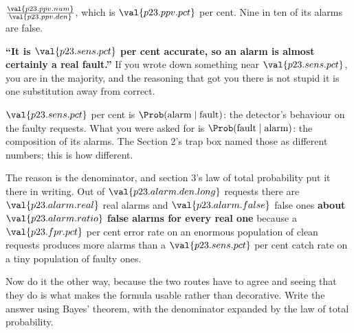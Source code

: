 \begin{fr}
\begin{ansblock}
$\frac{\val{p23.ppv.num}}{\val{p23.ppv.den}}$, which is
$\val{p23.ppv.pct}$ per cent. Nine in ten of its alarms are false.
\end{ansblock}

\begin{trapbox}
\textbf{\enquote{It is $\val{p23.sens.pct}$ per cent accurate, so an alarm is
almost certainly a real fault.}} If you wrote down something near
$\val{p23.sens.pct}$, you are in the majority, and the reasoning that got you
there is not stupid \dash{} it is one substitution away from correct.

$\val{p23.sens.pct}$ per cent is $\Prob(\text{alarm} \mid \text{fault})$: the
detector's behaviour on the faulty requests. What you were asked for is
$\Prob(\text{fault} \mid \text{alarm})$: the composition of its alarms. The
Section 2's trap box named those as different numbers; this is how
different.

The reason is the denominator, and section 3's law of total probability put it
there in writing. Out of $\val{p23.alarm.den.long}$ requests there are
$\val{p23.alarm.real}$ real alarms and $\val{p23.alarm.false}$ false ones
\dash{} \textbf{about $\val{p23.alarm.ratio}$ false alarms for every real
one} \dash{} because a $\val{p23.fpr.pct}$ per cent error rate on an enormous
population of clean requests produces more alarms than a
$\val{p23.sens.pct}$ per cent catch rate on a tiny population of faulty ones.
\end{trapbox}

Now do it the other way, because the two routes have to agree and seeing that
they do is what makes the formula usable rather than decorative. Write the
answer using Bayes' theorem, with the denominator expanded by the law of total
probability.
\dotline
\nextframe
\end{fr}

